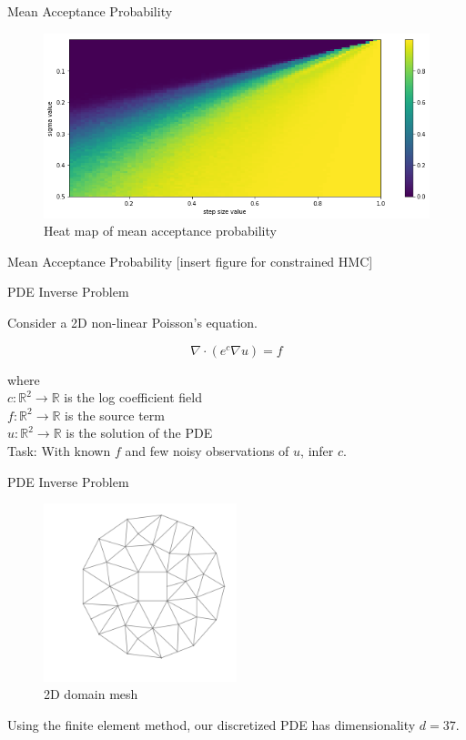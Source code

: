 \documentclass[10pt]{beamer}
\newcommand{\R}{\mathbb{R}}
\begin{document}
\begin{frame}[fragile]{Mean Acceptance Probability}
    \begin{figure}
    \includegraphics[width=\textwidth]{exp2.png}
    \caption{Heat map of mean acceptance probability}
    \end{figure}
\end{frame}

\begin{frame}[fragile]{Mean Acceptance Probability}
    [insert figure for constrained HMC]
\end{frame}

\begin{frame}[fragile]{PDE Inverse Problem}

    Consider a 2D non-linear Poisson's equation.

    $$ \nabla \cdot ( e^c \nabla u) = f$$
    
    where\\
    $c: \R^2 \rightarrow \R$  is the log coefficient field\\
    $f: \R^2 \rightarrow \R$ is the source term\\
    $u:  \R^2 \rightarrow \R$ is the solution of the PDE\\
    
    Task: With known $f$ and few noisy observations of $u$, infer $c$.
    
\end{frame}


\begin{frame}[fragile]{PDE Inverse Problem}
     
    \begin{figure}
        \includegraphics[width=0.5\textwidth]{pde_domain.png}
        \caption{2D domain mesh}
    \end{figure}
    
    Using the finite element method, our discretized PDE has dimensionality $d = 37$.
    
\end{frame}
\end{document}
